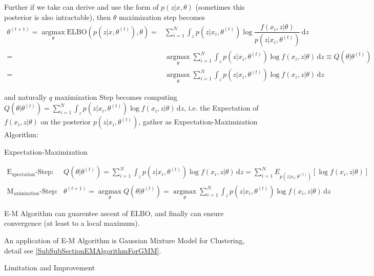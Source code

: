     Further if we take can derive and use the form of $ p(z|x,\theta ) $ (sometimes this posterior is also intractable), then $ \theta  $ maximization step becomes 
\begin{align}
    \theta ^{(t+1)}=\mathop{\arg\max}\limits_{\theta } \mathrm{ELBO} \left(p(z|x,\theta^{(t)} ),\theta \right)=&\sum_{i=1}^N\int_z p(z|x_i,\theta^{(t)})\log\dfrac{f(x_i,z|\theta )}{p(z|x_i,\theta^{(t)})} \,\mathrm{d}z\\
    =&\mathop{\arg\max }\limits_{\theta } \sum_{i=1}^N\int_z p(z|x_i,\theta^{(t)})\log f(x_i,z|\theta ) \,\mathrm{d}z\equiv Q(\theta |\theta ^{(t)})\\
    =&\mathop{\arg\max }\limits_{\theta }\sum_{i=1}^N \int_z p(z|x_i,\theta^{(t)})\log f(x_i,z|\theta ) \,\mathrm{d}z
\end{align}
    
    and naturally $ q $ maximization Step becomes computing $ \displaystyle Q(\theta |\theta ^{(t)})=\sum_{i=1}^N \int_z p(z|x_i,\theta^{(t)})\log f(x_i,z|\theta ) \,\mathrm{d}z $, i.e. the Expectation of $ f(x_i,z|\theta ) $ on the posterior $ p(z|x_i,\theta ^{(t)}) $, gather as Expectation-Maximization Algorithm:
\begin{algorithm}{Expectation-Maximization}

\begin{align}
    \mathrm{E_{xpectation}}\text{-Step}:&\,Q(\theta |\theta ^{(t)})=\sum_{i=1}^N \int_z p(z|x_i,\theta^{(t)})\log f(x_i,z|\theta ) \,\mathrm{d}z=\sum_{i=1}^NE_{p(z|x_i,\theta ^{(t)})}\left[\log f(x_i,z|\theta )\right]\\
    \mathrm{M_{aximization}}\text{-Step}:&\, \theta ^{(t+1)}=\mathop{\arg\max}\limits_{\theta }Q(\theta |\theta ^{(t)})=  \mathop{\arg\max}\limits_{\theta }\sum_{i=1}^N \int_z p(z|x_i,\theta^{(t)})\log f(x_i,z|\theta ) \,\mathrm{d}z
\end{align}
    
\end{algorithm}
    

    E-M Algorithm can guarentee ascent of $ \mathrm{ELBO}  $, and finally can ensure convergence (at least to a local maximum).

    An application of E-M Algorithm is Gaussian Mixture Model for Clustering, detail see \autoref{SubSubSectionEMAlgorithmForGMM}.

\begin{point}
    Limitation and Improvement
\end{point}

